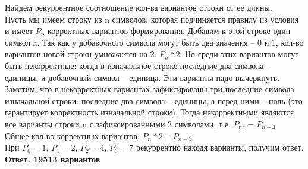 \documentclass[a4paper,12pt]{article}
\begin{document}
Найдем рекуррентное соотношение кол-ва вариантов строки от ее длины.
\\
Пусть мы имеем строку из n символов, которая подчиняется правилу из условия и имеет $P_n$ корректных вариантов формирования. Добавим к этой строке один символ a. Так как у добавочного символа могут быть два значения -- 0 и 1, кол-во вариантов новой строки умножается на 2: $ P_n * 2 $. Но среди этих вариантов могут быть некорректные: когда в изначальное строке последние два символа -- единицы, и добавочный символ -- единица. Эти варианты надо вычеркнуть. Заметим, что в некорректных вариантах зафиксированы три последние символа изначальной строки: последние два символа -- единицы, а перед ними -- ноль (это гарантирует корректность изначальной строки). Тогда некорректными являются все варианты строки n с зафиксированными 3 символами, т.е. $ P_{пл} = P_{n-3} $
\\
Общее кол-во корректных вариантов: $ P_n * 2 - P_{n-3} $
\\
При $P_0 = 1$, $P_1 = 2$, $P_2 = 4$, $P_3 = 7$ рекуррентно находя варианты, получим ответ.
\\
\textbf{Ответ. 19513 вариантов}
\\
\end{document}
